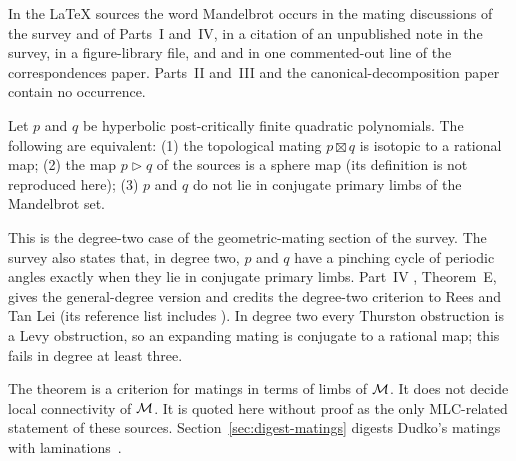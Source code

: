 In the LaTeX sources the word Mandelbrot occurs in the mating discussions of the survey and of Parts~I and~IV, in a citation of an unpublished note in the survey, in a figure-library file, and
and in one commented-out line of the correspondences paper.  Parts~II and~III and the canonical-decomposition
paper contain no occurrence.

\begin{theorem}
\label{thm:rees-tan-lei}
Let $p$ and $q$ be hyperbolic post-critically finite quadratic polynomials.  The following are equivalent:
(1) the topological mating $p\boxtimes q$ is isotopic to a rational map;
(2) the map $p\triangleright q$ of the sources is a sphere map (its definition is not reproduced here);
(3) $p$ and $q$ do not lie in conjugate primary limbs of the Mandelbrot set.
\end{theorem}

\begin{remark}
This is the degree-two case of the geometric-mating section of the survey.  The survey also states that, in degree two,
$p$ and $q$ have a pinching cycle of periodic angles exactly when they lie in conjugate primary limbs.  Part~IV
\cite{BartholdiDudkoIV}, Theorem~E, gives the general-degree version and credits the degree-two criterion to Rees and
Tan Lei (its reference list includes \cite{TanLei}).  In degree two every Thurston obstruction is a Levy obstruction, so an expanding mating is
conjugate to a rational map; this fails in degree at least three.
\end{remark}

The theorem is a criterion for matings in terms of limbs of $\mathcal M$.  It does not decide local connectivity of $\mathcal M$.
It is quoted here without proof as the only MLC-related statement of these sources.  Section~\ref{sec:digest-matings}
digests Dudko's matings with laminations~\cite{DudkoMatings}.
